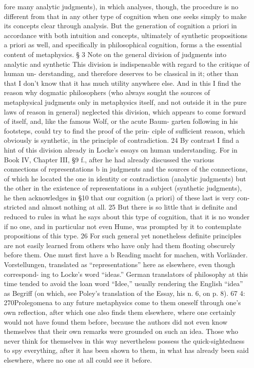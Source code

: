 fore many analytic judgments), in which analyses, though, the procedure
is no different from that in any other type of cognition when one seeks
simply to make its concepts clear through analysis. But the generation
of cognition a priori in accordance with both intuition and concepts,
ultimately of synthetic propositions a priori as well, and speciﬁcally in
philosophical cognition, forms a the essential content of metaphysics.
§ 3
Note on the general division of judgments
into analytic and synthetic
This division is indispensable with regard to the critique of human un-
derstanding, and therefore deserves to be classical in it; other than that I
don’t know that it has much utility anywhere else. And in this I ﬁnd the
reason why dogmatic philosophers (who always sought the sources of
metaphysical judgments only in metaphysics itself, and not outside it in
the pure laws of reason in general) neglected this division, which appears
to come forward of itself, and, like the famous Wolf, or the acute Baum-
garten following in his footsteps, could try to ﬁnd the proof of the prin-
ciple of sufﬁcient reason, which obviously is synthetic, in the principle of
contradiction. 24 By contrast I ﬁnd a hint of this division already in Locke’s
essays on human understanding. For in Book IV, Chapter III, §9 f., after
he had already discussed the various connections of representations b in
judgments and the sources of the connections, of which he located the
one in identity or contradiction (analytic judgments) but the other in the
existence of representations in a subject (synthetic judgments), he then
acknowledges in §10 that our cognition (a priori) of these last is very con-
stricted and almost nothing at all. 25 But there is so little that is deﬁnite
and reduced to rules in what he says about this type of cognition, that it
is no wonder if no one, and in particular not even Hume, was prompted
by it to contemplate propositions of this type. 26 For such general yet
nonetheless deﬁnite principles are not easily learned from others who
have only had them ﬂoating obscurely before them. One must ﬁrst have
a
b
Reading macht for machen, with Vorländer.
Vorstellungen, translated as “representations” here as elsewhere, even though correspond-
ing to Locke’s word “ideas.” German translators of philosophy at this time tended to
avoid the loan word “Idee,” usually rendering the English “idea” as Begriff (on which, see
Poley’s translation of the Essay, his n. 6, on p. 8).
67
4: 270Prolegomena to any future metaphysics
come to them oneself through one’s own reﬂection, after which one also
ﬁnds them elsewhere, where one certainly would not have found them
before, because the authors did not even know themselves that their
own remarks were grounded on such an idea. Those who never think for
themselves in this way nevertheless possess the quick-sightedness to spy
everything, after it has been shown to them, in what has already been
said elsewhere, where no one at all could see it before.

